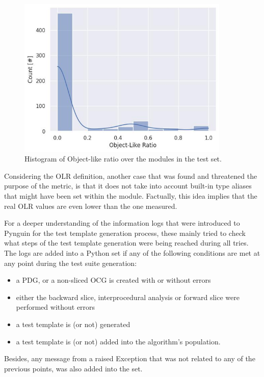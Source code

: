 \documentclass[%
  chapterprefix=false,%
  open=right,%
  twoside=true,%
  paper=a4,%
  logofile={Figures/logo.png},%
  thesistype=master,%
  UKenglish,%
]{se2thesis}
\begin{document}
\begin{figure}[bth]
  \centering
  \includegraphics[width=0.9\textwidth]{Figures/Results/olr-hist.jpg}
  \caption{Histogram of Object-like ratio over the modules in the test set.}\label{fig:olr-hist}
\end{figure}

Considering the OLR definition, another case that was found and threatened the purpose of the metric, is that it does not take into account built-in type aliases that might have been set within the module.
Factually, this idea implies that the real OLR values are even lower than the one measured.

For a deeper understanding of the information logs that were introduced to Pynguin for the test template generation process, these mainly tried to check what steps of the test template generation were being reached during all tries.
The logs are added into a Python set if any of the following conditions are met at any point during the test suite generation:
\begin{itemize} 
  \item a PDG, or a non-sliced OCG is created with or without errors
  \item either the backward slice, interprocedural analysis or forward slice were performed without errors
  \item a test template is (or not) generated
  \item a test template is (or not) added into the algorithm's population.
\end{itemize}
Besides, any message from a raised Exception that was not related to any of the previous points, was also added into the set.
\end{document}
